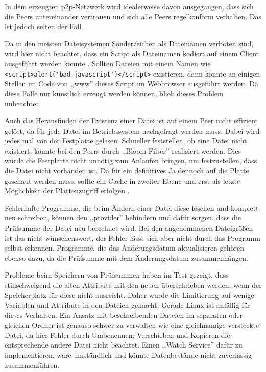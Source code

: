 \documentclass[oneside, ngerman, toc=bibliography,bibliography=totoc,listof=entryprefix, open=right,numbers=noenddot,fontsize=12pt]{scrbook}
\begin{document}
In dem erzeugten \acrshort{p2p}-Netzwerk wird idealerweise davon ausgegangen, dass sich die Peers untereinander vertrauen und sich alle Peers regelkonform verhalten.
Das ist jedoch selten der Fall.

Da in den meisten Dateisystemen Sonderzeichen als Dateinamen verboten sind, wird hier nicht beachtet, dass ein Script als Dateinamen kodiert auf einem Client ausgeführt werden könnte \cite{winforbit}. Sollten Dateien mit einem Namen wie \verb|<script>alert('bad javascript')</script>| existieren, dann könnte an einigen Stellen im Code von ,,www'' dieses Script im Webbrowser ausgeführt werden. Da diese Fälle nur künstlich erzeugt werden können, blieb dieses Problem unbeachtet.

Auch das Herausfinden der Existenz einer Datei ist auf einem Peer nicht effizient gelöst, da für jede Datei im Betriebssystem nachgefragt werden muss.
Dabei wird jedes mal von der Festplatte gelesen.
Schneller feststellen, ob eine Datei nicht existiert, könnte bei den Peers durch ,,Bloom Filter'' realisiert werden. Dies würde die Festplatte nicht unnötig  zum Anlaufen bringen, um festzustellen, dass die Datei nicht vorhanden ist. Da für ein definitives Ja dennoch auf die Platte geschaut werden muss, sollte ein Cache in zweiter Ebene und erst als letzte Möglichkeit der Plattenzugriff erfolgen \cite{bejeck2013getting}.  

Fehlerhafte Programme, die beim Ändern einer Datei diese löschen und komplett neu schreiben, können den ,,provider'' behindern und dafür sorgen, dass die Prüfsumme der Datei neu berechnet wird. Bei den angenommenen Dateigrößen ist das nicht wünschenswert, der Fehler lässt sich aber nicht durch das Programm selbst erkennen. Programme, die das Änderungsdatum aktualisieren gehören ebenso dazu, da die Prüfsumme mit dem Änderungsdatum zusammenhängen.

Probleme beim Speichern von Prüfsummen haben im Test gezeigt, dass stillschweigend die alten Attribute mit den neuen überschrieben werden, wenn der Speicherplatz für diese nicht ausreicht. Daher wurde die Limitierung auf wenige Variablen und Attribute in den Dateien gemacht. Gerade Linux ist anfällig für dieses Verhalten.
Ein Ansatz mit beschreibenden Dateien im separaten oder gleichen Ordner ist genauso schwer zu verwalten wie eine gleichnamige versteckte Datei, da hier Fehler durch Umbenennen, Verschieben und Kopieren die entsprechende andere Datei nicht beachtet. Einen ,,Watch Service'' dafür zu implementieren, wäre umständlich und könnte Datenbestände nicht zuverlässig zusammenführen.
\end{document}
